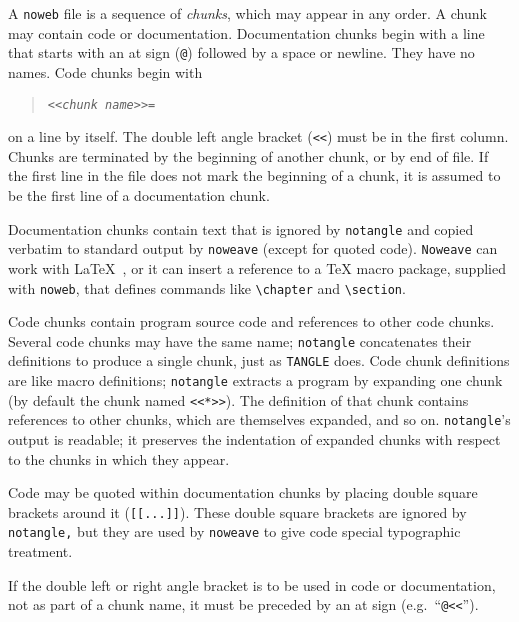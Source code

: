 A {\tt noweb} file is a sequence of {\em chunks}, which may appear in any order.
A chunk may contain code or documentation.
Documentation chunks begin with a line that starts with an at sign ({\tt @})
followed by a space or newline.
They have no names.
Code chunks begin with
\begin{quote} 
\tt <<{\it chunk name}>>=
\end{quote} 
on a line by itself.
The double left angle bracket ({\tt <<}) must be in the first column.
Chunks are terminated by the beginning of another chunk, or by end of file.
If the first line in the file does not mark the beginning of a
chunk, it is assumed to be the first line of a documentation chunk.

Documentation chunks contain text that is ignored by {\tt notangle}
and copied verbatim to standard output by
{\tt noweave} (except for quoted code).   
{\tt Noweave} can work with {\LaTeX}~\cite{lamport:latex}, or it can
insert a reference to 
a {\TeX} macro package, supplied with {\tt noweb}, that defines
commands like \verb+\chapter+ and \verb+\section+.

Code chunks contain program source code and references to other code
chunks.  
Several code chunks may have the same name; {\tt notangle}
concatenates their definitions to produce a single chunk, just as
 {\tt TANGLE} does.
Code chunk definitions are like macro definitions;
{\tt notangle} extracts a program by expanding one chunk (by default
the chunk named \verb+<<*>>+).
The definition of that chunk contains references to other chunks,
which are themselves expanded, and so on.
{\tt notangle}'s output is readable; it preserves the indentation of expanded
chunks with respect to the chunks in which they appear.

Code may be quoted within documentation chunks by placing double
square brackets around it ({\tt [[...]]}). 
These double square brackets are ignored by {\tt notangle,} but they
are used by {\tt noweave} to give code special typographic
treatment.

If the double left or right angle %
bracket is to be used in code or documentation,
not as part of a chunk name, it must be preceded by an at sign
(e.g.~``{\tt @<<}''). 

